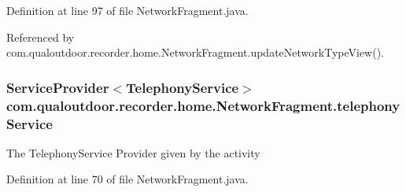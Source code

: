 Definition at line 97 of file Network\-Fragment.\-java.



Referenced by com.\-qualoutdoor.\-recorder.\-home.\-Network\-Fragment.\-update\-Network\-Type\-View().

\hypertarget{classcom_1_1qualoutdoor_1_1recorder_1_1home_1_1NetworkFragment_a35dd597a3f347ab93d8e9df9a59e7fc3}{
\subsubsection[{telephony\-Service}]{\setlength{\rightskip}{0pt plus 5cm}Service\-Provider$<${\bf Telephony\-Service}$>$ com.\-qualoutdoor.\-recorder.\-home.\-Network\-Fragment.\-telephony\-Service\hspace{0.3cm}{\ttfamily [private]}}}\label{classcom_1_1qualoutdoor_1_1recorder_1_1home_1_1NetworkFragment_a35dd597a3f347ab93d8e9df9a59e7fc3}
The Telephony\-Service Provider given by the activity 

Definition at line 70 of file Network\-Fragment.\-java.


